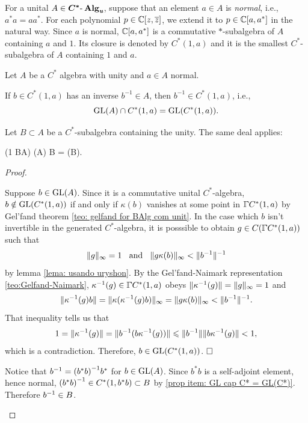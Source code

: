 For a unital $A \in {\boldsymbol{C^*\text{-}\operatorname{Alg}}}_{\textit{\textbf{u}}}$, suppose that an element $a\in A$ is \textit{normal}, i.e., $a^*a=aa^*$. For each polynomial $p \in \operatorname{\mathbb{C}}[z,\overline{z}]$, we extend it to $p \in \operatorname{\mathbb{C}}[a, a^*]$ in the natural way. Since $a$ is normal, $\operatorname{\mathbb{C}}[a, a^*]$ is a commutative $*$-subalgebra of $A$ containing $a$ and $1$. Its closure is denoted by $C^*(1,a)$ and it is the smallest $C^*$-subalgebra of $A$ containing $1$ and $a$.

\begin{proposicao}
Let $A$ be a $C^{*}$ algebra with unity and $a \in A$ normal. 
\begin{itroman}
\item \label{prop item: GL cap C* = GL(C*)} If $b \in C^{*}(1, a)$ has an inverse $b^{-1} \in A$, then $b^{-1} \in C^{*}(1, a)$, i.e.,
\[\operatorname{GL}(A) \cap C^*(1,a) = \operatorname{GL}(C^*(1,a)).\]
\item Let $B \subset A$ be a $C^*$-subalgebra containing the unity. The same deal applies:
\begin{eqspaced*}{(1 \in B\subset A)}
\GL(A) \cap B = \GL(B).
\end{eqspaced*}
\end{itroman}
\end{proposicao}
\begin{proof}$\left.\right.$
\begin{itroman}
\item 
Suppose $b\in \operatorname{GL}(A)$. Since it is a commutative unital $C^{*}$-algebra, $b \notin \operatorname{GL}(C^*(1,a))$ if and only if $\kappa(b)$ vanishes at some point in $\GGamma{C^{*}(1, a)}$ by Gel'fand theorem \ref{teo: gelfand for BAlg com unit}. In the case which $b$ isn't invertible in the generated $C^*$-algebra, it is posssible to obtain $g \in C(\GGamma{C^{*}(1, a)})$ such that 
$$\|g\|_{\infty}=1 \hspace{0.25cm}\operatorname{and}\hspace{0.25cm} \|g\kappa(b)\|_{\infty} <\|b^{-1}\|^{-1}$$ 
by lemma \ref{lema: usando uryshon}. By the Gel'fand-Naimark representation \ref{teo:Gelfand-Naimark}, $\inv\kappa(g) \in \GGamma{C^{*}(1, a)}$ obeys $\|{\kappa}^{-1}(g)\|=\|g\|_{\infty}=1$ and
\[
\|{\kappa}^{-1}(g)b\|= \|\kappa({\kappa}^{-1}(g) b)\|_{\infty}=\| g\kappa(b)\|_{\infty}<\|b^{-1}\|^{-1}.\] 
That inequality tells us that
$$
1=\|{\kappa}^{-1}(g)\|=\|b^{-1}(b {\kappa}^{-1}(g))\| \leqslant \|b^{-1}\|\|b {\kappa}^{-1}(g)\|<1,
$$
which is a contradiction. Therefore, $b \in \operatorname{GL}(C^*(1,a))$. $\hfill\square$

\item Notice that ${b}^{-1} = {(b^*b)}^{-1}b^*$ for $b \in \operatorname{GL}(A)$. Since $b^*b$ is a self-adjoint element, hence normal, ${(b^*b)}^{-1} \in C^*(1,b^*b) \subset B$ by \ref{prop item: GL cap C* = GL(C*)}. Therefore ${b}^{-1} \in B$. \qedhere
\end{itroman}
\end{proof}

